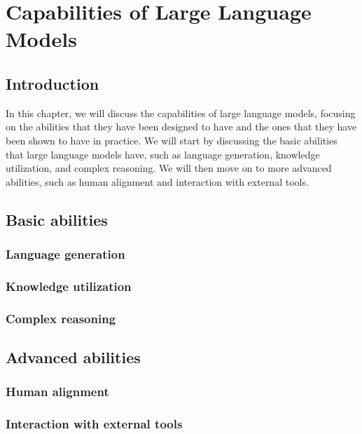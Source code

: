 
\chapter{Capabilities of Large Language Models}
\label{ch:capabilities}

\section{Introduction}
\label{sec:ch3-introduction}

In this chapter, we will discuss the capabilities of large language models, focusing on the abilities that they have been designed to have and the ones that they have been shown to have in practice.
We will start by discussing the basic abilities that large language models have, such as language generation, knowledge utilization, and complex reasoning.
We will then move on to more advanced abilities, such as human alignment and interaction with external tools.

\section{Basic abilities}
\label{sec:basic-abilities}

\subsection{Language generation}
\label{subsec:language-generation}

\subsection{Knowledge utilization}
\label{subsec:knowledge-utilization}

\subsection{Complex reasoning}
\label{subsec:complex-reasoning}

\section{Advanced abilities}
\label{sec:advanced-abilities}

\subsection{Human alignment}
\label{subsec:human-alignment}

\subsection{Interaction with external tools}
\label{subsec:interaction-with-external-tools}
























